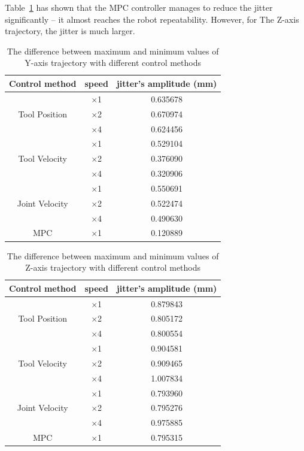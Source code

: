 Table~\ref{tab:y_jitter} has shown that the \ac {MPC} controller manages to reduce the jitter significantly -- it almost reaches the robot repeatability. However, for The Z-axis trajectory, the jitter is much larger. 

\begin{table}
	\centering
	\caption{The difference between maximum and minimum values of Y-axis trajectory with different control methods}
	\begin{tabular}{|c|c|c|}
		\hline
		Control method & speed & jitter's amplitude (mm) \\
		\hline		
		& $ \times $1 & 0.635678\\
		Tool Position & $ \times $2 & 0.670974\\
		& $ \times $4 & 0.624456\\
		\hline		
		& $ \times $1 & 0.529104\\
		Tool Velocity & $ \times $2 & 0.376090\\
		& $ \times $4 & 0.320906\\
		\hline		
		& $ \times $1 & 0.550691\\
		Joint Velocity & $ \times $2 & 0.522474\\
		& $ \times $4 & 0.490630\\				
		\hline
		\ac {MPC} & $ \times $1 & 0.120889 \\
		\hline

	\end{tabular}
	\label{tab:y_jitter}
\end{table}

\begin{table}
	\centering
	\caption{The difference between maximum and minimum values of Z-axis trajectory with different control methods}
	\begin{tabular}{|c|c|c|}
		\hline
		Control method & speed & jitter's amplitude (mm) \\
		\hline		
		& $ \times $1 & 0.879843\\
		Tool Position & $ \times $2 & 0.805172\\
		& $ \times $4 & 0.800554\\
		\hline		
		& $ \times $1 & 0.904581\\
		Tool Velocity & $ \times $2 & 0.909465\\
		& $ \times $4 & 1.007834\\
		\hline		
		& $ \times $1 & 0.793960\\
		Joint Velocity & $ \times $2 & 0.795276\\
		& $ \times $4 & 0.975885\\				
		\hline
		\ac {MPC} & $ \times $1 & 0.795315 \\
		\hline
		
	\end{tabular}
	\label{tab:z_jitter}
\end{table}


